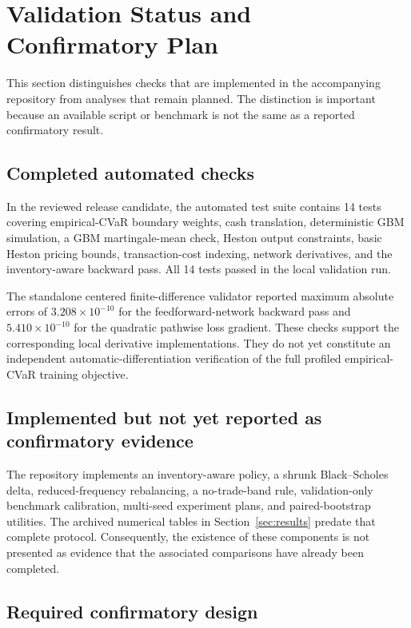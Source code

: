 \section{Validation Status and Confirmatory Plan}
\label{sec:robustness}

This section distinguishes checks that are implemented in the accompanying
repository from analyses that remain planned. The distinction is important
because an available script or benchmark is not the same as a reported
confirmatory result.

\subsection{Completed automated checks}

In the reviewed release candidate, the automated test suite contains 14 tests
covering empirical-CVaR boundary weights, cash translation, deterministic GBM
simulation, a GBM martingale-mean check, Heston output constraints, basic Heston
pricing bounds, transaction-cost indexing, network derivatives, and the
inventory-aware backward pass. All 14 tests passed in the local validation run.

The standalone centered finite-difference validator reported maximum absolute
errors of $3.208\times10^{-10}$ for the feedforward-network backward pass and
$5.410\times10^{-10}$ for the quadratic pathwise loss gradient. These checks
support the corresponding local derivative implementations. They do not yet
constitute an independent automatic-differentiation verification of the full
profiled empirical-CVaR training objective.

\subsection{Implemented but not yet reported as confirmatory evidence}

The repository implements an inventory-aware policy, a shrunk Black--Scholes
delta, reduced-frequency rebalancing, a no-trade-band rule, validation-only
benchmark calibration, multi-seed experiment plans, and paired-bootstrap
utilities. The archived numerical tables in Section~\ref{sec:results} predate
that complete protocol. Consequently, the existence of these components is not
presented as evidence that the associated comparisons have already been
completed.

\subsection{Required confirmatory design}

